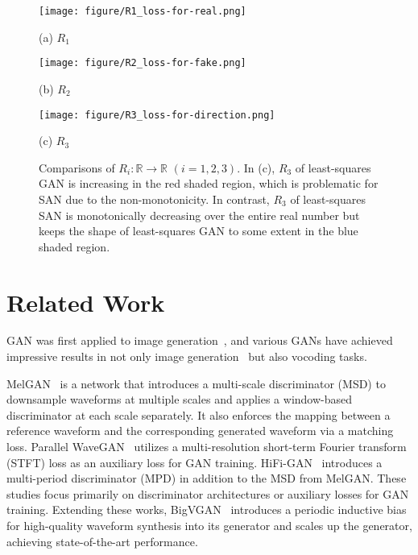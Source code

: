 \documentclass{article}
\begin{document}
\begin{figure*}[htb]
\begin{minipage}[b]{0.3\linewidth}
  \centering
  \centerline{\texttt{[image: figure/R1\_loss-for-real.png]}}
  \centerline{(a) $R_1$}\medskip
\end{minipage}
\hfill
\begin{minipage}[b]{.3\linewidth}
  \centering
  \centerline{\texttt{[image: figure/R2\_loss-for-fake.png]}}
  \centerline{(b) $R_2$}\medskip
\end{minipage}
\hfill
\begin{minipage}[b]{0.3\linewidth}
  \centering
  \centerline{\texttt{[image: figure/R3\_loss-for-direction.png]}}
  \centerline{(c) $R_3$}\medskip
\end{minipage}
\caption{Comparisons of $R_i:\mathbb{R}\to\mathbb{R}$ $(i=1,2,3)$. In (c), $R_3$ of least-squares GAN is increasing in the red shaded region, which is problematic for SAN due to the non-monotonicity. In contrast, $R_3$ of least-squares SAN is monotonically decreasing over the entire real number but keeps the shape of least-squares GAN to some extent in the blue shaded region.}
\label{fig:comparision_objectives}
\end{figure*}

\section{Related Work}
\label{sec:relateed_work}

GAN was first applied to image generation~\cite{goodfellow2014generative}, and various GANs have achieved impressive results in not only image generation~\cite{karras2019style,sauer2022styleganxl} but also vocoding tasks.

MelGAN~\cite{kumar2019melgan} is a network that introduces a multi-scale discriminator (MSD) to downsample waveforms at multiple scales and applies a window-based discriminator at each scale separately. It also enforces the mapping between a reference waveform and the corresponding generated waveform via a matching loss. Parallel WaveGAN~\cite{yamamoto2020parallel} utilizes a multi-resolution short-term Fourier transform (STFT) loss as an auxiliary loss for GAN training. HiFi-GAN~\cite{kong2020hifigan} introduces a multi-period discriminator (MPD) in addition to the MSD from MelGAN. 
These studies focus primarily on discriminator architectures or auxiliary losses for GAN training. Extending these works, BigVGAN~\cite{lee2023bigvgan} introduces a periodic inductive bias for high-quality waveform synthesis into its generator and scales up the generator, achieving state-of-the-art performance.
\end{document}
